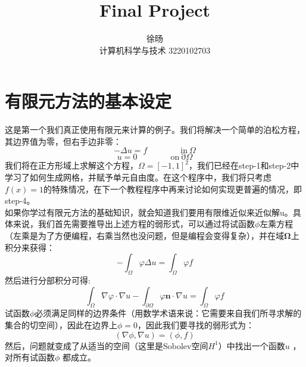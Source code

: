 \documentclass[nofonts]{ctexart} %
\title{Final Project}
\author{徐旸 \\ 计算机科学与技术 3220102703}
\begin{document}
\maketitle

\section{有限元方法的基本设定}
这是第一个我们真正使用有限元来计算的例子。我们将解决一个简单的泊松方程，其边界值为零，但右手边非零：
\begin{equation}
 -\Delta u=f\quad\quad\quad\quad\mathrm{in~}\Omega
\end{equation}
\begin{equation}
 u=0\quad\quad\quad\quad\mathrm{on~\partial}\Omega
\end{equation}
我们将在正方形域上求解这个方程，$\Omega=[-1,1]^2$，我们已经在step-1和step-2中学习了如何生成网格，并赋予单元自由度。在这个程序中，我们将只考虑$f(x)=1$的特殊情况，在下一个教程程序中再来讨论如何实现更普遍的情况，即step-4。\\
如果你学过有限元方法的基础知识，就会知道我们要用有限维近似来近似解u。具体来说，我们首先需要推导出上述方程的弱形式，可以通过将试函数$\phi$左乘方程（左乘是为了方便编程，右乘当然也没问题，但是编程会变得复杂），并在域$\boldsymbol{\Omega}$上积分来获得：
\begin{equation}
-\int_\Omega\varphi\Delta u=\int_\Omega\varphi f
\end{equation}
然后进行分部积分可得:
\begin{equation}
\int_{\Omega}\nabla\varphi\cdot\nabla u-\int_{\partial\Omega}\varphi\mathbf{n}\cdot\nabla u=\int_{\Omega}\varphi f
\end{equation}
试函数$\phi$必须满足同样的边界条件（用数学术语来说：它需要来自我们所寻求解的集合的切空间），因此在边界上$\phi=0$，因此我们要寻找的弱形式为：
\begin{equation}
(\nabla\phi,\nabla u)=(\phi,f)
\end{equation}
然后，问题就变成了从适当的空间（这里是Sobolev空间$H^{1}$）中找出一个函数$u$
，对所有试函数$\phi$
都成立。\\
\end{document}
